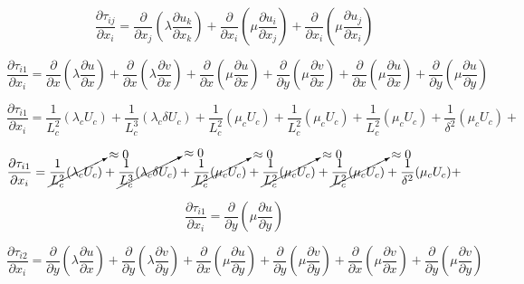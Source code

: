 \begin{equation} 
\frac{\partial\tau_{ij}}{\partial x_i}=
\frac{\partial}{\partial x_j}\left(\lambda \frac{\partial u_k}{\partial x_k}\right)+
\frac{\partial}{\partial x_i}\left(\mu\frac{\partial u_i}{\partial x_j}\right)+
\frac{\partial}{\partial x_i}\left(\mu\frac{\partial u_j}{\partial x_i}\right)
\end{equation} 

\begin{equation} 
\frac{\partial\tau_{i1}}{\partial x_i}=
\frac{\partial}{\partial x}\left(\lambda\frac{\partial u}{\partial x}\right)+
\frac{\partial}{\partial x}\left(\lambda\frac{\partial v}{\partial x}\right)+
\frac{\partial}{\partial x}\left(\mu\frac{\partial u}{\partial x}\right)+
\frac{\partial}{\partial y}\left(\mu\frac{\partial v}{\partial x}\right)+
\frac{\partial}{\partial x}\left(\mu\frac{\partial u}{\partial x}\right)+
\frac{\partial}{\partial y}\left(\mu\frac{\partial u}{\partial y}\right)
\end{equation} 

\begin{equation} 
\frac{\partial\tau_{i1}}{\partial x_i}=
\frac{1}{L_c^2}(\lambda_c U_c)+
\frac{1}{L_c^3}(\lambda_c \delta U_c)+
\frac{1}{L_c^2}(\mu_c U_c)+
\frac{1}{L_c^2}(\mu_c U_c)+
\frac{1}{L_c^2}(\mu_c U_c)+
\frac{1}{\delta^2}(\mu_c U_c)+
\end{equation} 

\begin{equation} 
\frac{\partial\tau_{i1}}{\partial x_i}=
	\cancelto{\approx0}{\frac{1}{L_c^2}(\lambda_c U_c)}+
\cancelto{\approx0}{\frac{1}{L_c^3}(\lambda_c \delta U_c)}+
\cancelto{\approx0}{\frac{1}{L_c^2}(\mu_c U_c)}+
\cancelto{\approx0}{\frac{1}{L_c^2}(\mu_c U_c)}+
\cancelto{\approx0}{\frac{1}{L_c^2}(\mu_c U_c)}+
\frac{1}{\delta^2}(\mu_c U_c)+
\end{equation} 

\begin{equation} 
\frac{\partial\tau_{i1}}{\partial x_i}=
\frac{\partial}{\partial y}\left(\mu\frac{\partial u}{\partial y}\right)
\end{equation} 

\begin{equation} 
\frac{\partial\tau_{i2}}{\partial x_i}=
\frac{\partial}{\partial y}\left(\lambda\frac{\partial u}{\partial x}\right)+
\frac{\partial}{\partial y}\left(\lambda\frac{\partial v}{\partial y}\right)+
\frac{\partial}{\partial x}\left(\mu\frac{\partial u}{\partial y}\right)+
\frac{\partial}{\partial y}\left(\mu\frac{\partial v}{\partial y}\right)+
\frac{\partial}{\partial x}\left(\mu\frac{\partial v}{\partial x}\right)+
\frac{\partial}{\partial y}\left(\mu\frac{\partial v}{\partial y}\right)
\end{equation} 

